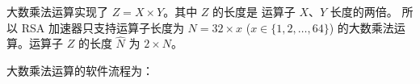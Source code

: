 \documentclass[main\_\_CN.tex]{subfiles}
\begin{document}
大数乘法运算实现了 \begin{math}Z = X \times Y\end{math}。其中 \begin{math}Z\end{math} 的长度是
运算子 \begin{math}X\end{math}、\begin{math}Y\end{math} 长度的两倍。
所以 RSA 加速器只支持运算子长度为 \begin{math}N = 32 \times x\end{math} (\begin{math}x \in \{ 1, 2, \dots, 64\} \end{math}) 的大数乘法运算。运算子 \begin{math}Z\end{math} 的长度 \begin{math}\hat{N}\end{math} 为 \begin{math}2 \times N\end{math}。


大数乘法运算的软件流程为：
\end{document}
